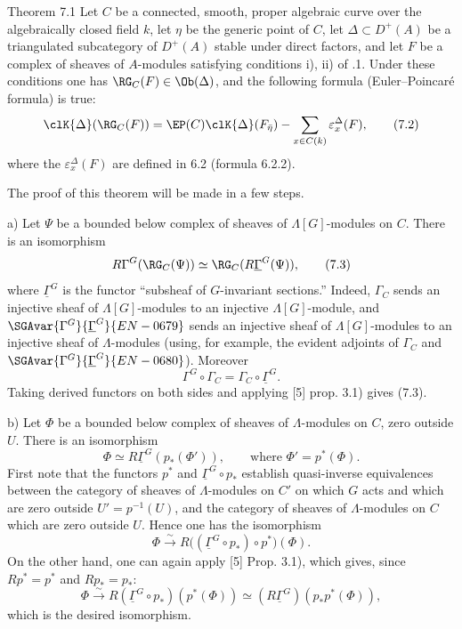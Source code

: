 \begin{statement}{Theorem 7.1}
Let $C$ be a connected, smooth, proper algebraic curve over the algebraically closed field $k$, let $\eta$ be the generic point of $C$, let $\Delta\subset D^+(A)$ be a triangulated subcategory of $D^+(A)$ stable under direct factors, and let $F$ be a complex of sheaves of $A$-modules satisfying conditions i), ii) of .1. Under these conditions one has $\RG_C(F)\in\Ob(\Delta)$, and the following formula (Euler--Poincaré formula) is true:
\[
\clK{\Delta}(\RG_C(F))
=
\EP(C)\clK{\Delta}(F_{\bar\eta})
-\sum_{x\in C(k)}\varepsilon_x^\Delta(F),
\tag{7.2}
\]
where the $\varepsilon_x^\Delta(F)$ are defined in 6.2 (formula 6.2.2).
\end{statement}

The proof of this theorem will be made in a few steps.

a) Let $\Psi$ be a bounded below complex of sheaves of $\Lambda[G]$-modules on $C$. There is an isomorphism
\[
R\Gamma^G(\RG_C(\Psi))\simeq\RG_C(R\underline{\Gamma}^G(\Psi)),
\tag{7.3}
\]
where $\underline{\Gamma}^G$ is the functor ``subsheaf of $G$-invariant sections.'' Indeed, $\Gamma_C$ sends an injective sheaf of $\Lambda[G]$-modules to an injective $\Lambda[G]$-module, and $\SGAvar{\Gamma^G}{\underline{\Gamma}^G}{EN-0679}$ sends an injective sheaf of $\Lambda[G]$-modules to an injective sheaf of $\Lambda$-modules (using, for example, the evident adjoints of $\Gamma_C$ and $\SGAvar{\Gamma^G}{\underline{\Gamma}^G}{EN-0680}$). Moreover
\[
\Gamma^G\circ\Gamma_C=\Gamma_C\circ\underline{\Gamma}^G.
\]
Taking derived functors on both sides and applying [5] prop. 3.1) gives (7.3).

b) Let $\Phi$ be a bounded below complex of sheaves of $\Lambda$-modules on $C$, zero outside $U$. There is an isomorphism
\[
\Phi\simeq R\underline{\Gamma}^G(p_*(\Phi')),
\qquad\text{where } \Phi'=p^*(\Phi).
\tag{7.4}
\]
First note that the functors $p^*$ and $\underline{\Gamma}^G\circ p_*$ establish quasi-inverse equivalences between the category of sheaves of $\Lambda$-modules on $C'$ on which $G$ acts and which are zero outside $U'=p^{-1}(U)$, and the category of sheaves of $\Lambda$-modules on $C$ which are zero outside $U$. Hence one has the isomorphism
\[
\Phi\xrightarrow{\sim} R\bigl((\underline{\Gamma}^G\circ p_*)\circ p^*\bigr)(\Phi).
\]
On the other hand, one can again apply [5] Prop. 3.1), which gives, since $Rp^*=p^*$ and $Rp_*=p_*$:
\[
\Phi\xrightarrow{\sim} R(\underline{\Gamma}^G\circ p_*)(p^*(\Phi))
\simeq (R\underline{\Gamma}^G)(p_*p^*(\Phi)),
\]
which is the desired isomorphism.

